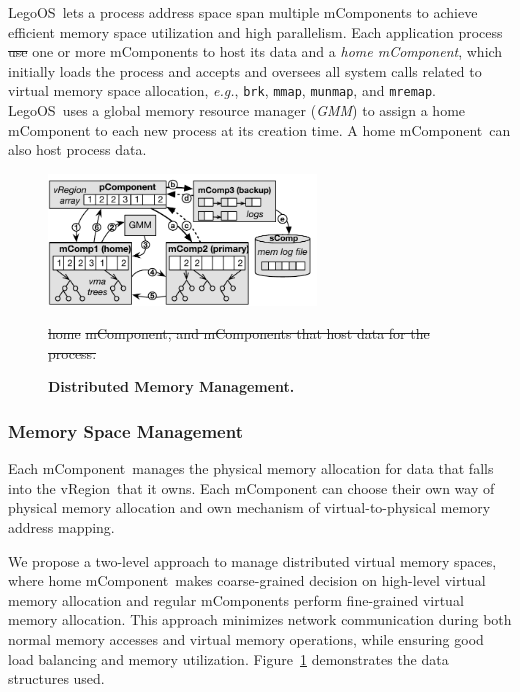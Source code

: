 \documentclass[10pt,times,twocolumn]{z2-article}
\renewcommand{\em}{\it}
\newcommand{\figWidth}{\columnwidth}
\newcommand{\beforecaption}{\vspace{-.15cm}\begin{spacing}{0.85}}
\newcommand{\aftercaption}{\vspace{-.45cm}\end{spacing}}
\newcommand{\mycaption}[3]{\beforecaption\caption{\label{#1}{\bf\footnotesize #2} \em\scriptsize #3}\aftercaption}
\newcommand{\eg}{\textit{e.g.}}
\newcommand{\lego}{LegoOS}
\newcommand{\mmap}{{\texttt{mmap}}}
\newcommand{\munmap}{{\texttt{munmap}}}
\newcommand{\mremap}{{\texttt{mremap}}}
\newcommand{\gmm}{GMM}
\newcommand{\vregion}{vRegion}
\newcommand{\brk}{{\texttt{brk}}}
\newcommand{\mcomponent}{mComponent}
\providecommand{\DIFaddtex}[1]{{\protect\color{blue}\uwave{#1}}} %
\providecommand{\DIFdeltex}[1]{{\protect\color{red}\sout{#1}}}                      %
\providecommand{\DIFaddbegin}{} %
\providecommand{\DIFaddend}{} %
\providecommand{\DIFdelbegin}{} %
\providecommand{\DIFdelend}{} %
\providecommand{\DIFdelFL}[1]{\DIFdel{#1}} %
\providecommand{\DIFaddbeginFL}{} %
\providecommand{\DIFaddendFL}{} %
\providecommand{\DIFdelbeginFL}{} %
\providecommand{\DIFdelendFL}{} %
\providecommand{\DIFadd}[1]{\texorpdfstring{\DIFaddtex{#1}}{#1}} %
\providecommand{\DIFdel}[1]{\texorpdfstring{\DIFdeltex{#1}}{}} %
\newcommand{\DIFscaledelfig}{0.5}
\newlength{\DIFdelgraphicswidth} %
\newlength{\DIFdelgraphicsheight} %
\newcommand{\DIFaddincludegraphics}[2][]{{\color{blue}\fbox{\DIFOincludegraphics[#1]{#2}}}} %
\newcommand{\DIFdelincludegraphics}[2][]{%
\sbox{\DIFdelgraphicsbox}{\DIFOincludegraphics[#1]{#2}}%
\settoboxwidth{\DIFdelgraphicswidth}{\DIFdelgraphicsbox} %
\settoboxtotalheight{\DIFdelgraphicsheight}{\DIFdelgraphicsbox} %
\scalebox{\DIFscaledelfig}{%
\parbox[b]{\DIFdelgraphicswidth}{\usebox{\DIFdelgraphicsbox}\\[-\baselineskip] \rule{\DIFdelgraphicswidth}{0em}}\llap{\resizebox{\DIFdelgraphicswidth}{\DIFdelgraphicsheight}{%
\setlength{\unitlength}{\DIFdelgraphicswidth}%
\begin{picture}(1,1)%
\thicklines\linethickness{2pt} %
{\color[rgb]{1,0,0}\put(0,0){\framebox(1,1){}}}%
{\color[rgb]{1,0,0}\put(0,0){\line( 1,1){1}}}%
{\color[rgb]{1,0,0}\put(0,1){\line(1,-1){1}}}%
\end{picture}%
}\hspace*{3pt}}} %
} %
\DeclareRobustCommand{\DIFaddbegin}{\DIFOaddbegin \let\includegraphics\DIFaddincludegraphics} %
\DeclareRobustCommand{\DIFaddend}{\DIFOaddend \let\includegraphics\DIFOincludegraphics} %
\DeclareRobustCommand{\DIFdelbegin}{\DIFOdelbegin \let\includegraphics\DIFdelincludegraphics} %
\DeclareRobustCommand{\DIFdelend}{\DIFOaddend \let\includegraphics\DIFOincludegraphics} %
\DeclareRobustCommand{\DIFaddbeginFL}{\DIFOaddbeginFL \let\includegraphics\DIFaddincludegraphics} %
\DeclareRobustCommand{\DIFaddendFL}{\DIFOaddendFL \let\includegraphics\DIFOincludegraphics} %
\DeclareRobustCommand{\DIFdelbeginFL}{\DIFOdelbeginFL \let\includegraphics\DIFdelincludegraphics} %
\DeclareRobustCommand{\DIFdelendFL}{\DIFOaddendFL \let\includegraphics\DIFOincludegraphics} %
\begin{document}
{{{{{{{{\lego\ lets a process address space span multiple \mcomponent{}s
to achieve efficient memory space utilization and high parallelism.
Each application process \DIFdelbegin \DIFdel{use }\DIFdelend \DIFaddbegin \DIFadd{uses }\DIFaddend one or more \mcomponent{}s to host its data
and a {\em home \mcomponent},
which initially loads the process
and accepts and oversees all system calls related to virtual memory space allocation, 
\eg, \brk, \mmap, \munmap, and \mremap.
\lego\ uses a global memory resource manager ({\em \gmm}) to assign a home \mcomponent{} to each new process at its creation time.
A home \mcomponent\ can also host process data.

 \DIFaddbegin \begin{figure}[th]
\begin{minipage}{\figWidth}
\begin{center}
\centerline{\includegraphics[width=2.8in]{Figures/dist-vma.pdf}}
\vspace{-0.1in}
\mycaption{fig-dist-vma}{Distributed Memory Management.}
\DIFaddendFL {
\DIFdelbeginFL %
\DIFdelFL{home}\DIFdelendFL }
\DIFdelbeginFL \DIFdelFL{\mcomponent,
and \mcomponent{}s that host data for the process.
}%
\DIFdelendFL \DIFaddbeginFL \end{center}
\end{minipage}
\vspace{-0.15in}
\end{figure}
}
\DIFaddend 

\subsubsection{Memory Space Management}
Each \mcomponent\ manages the physical memory allocation for data that falls into the
\vregion\ that it owns.
Each \mcomponent{} can choose their own way of physical memory allocation
and own mechanism of virtual-to-physical memory address mapping.

We propose a two-level approach to manage distributed virtual memory spaces,
where home \mcomponent\ makes coarse-grained decision on high-level virtual memory allocation
and regular \mcomponent{}s perform fine-grained virtual memory allocation.
This approach minimizes network communication during both normal memory accesses and virtual memory operations,
while ensuring good load balancing and memory utilization.
Figure~\ref{fig-dist-vma} demonstrates the data structures used. %

}}}}}}}
\end{document}
